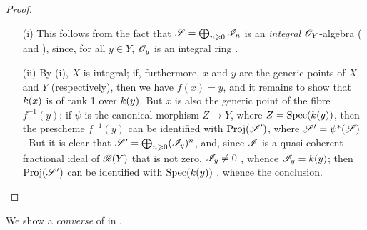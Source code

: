 \begin{proof}
\label{proof-2.8.1.4}
\begin{enumerate}
    \item[\rm{(i)}] This follows from the fact that $\mathscr{S} = \bigoplus_{n\geqslant0}\mathscr{I}_n$ is an \emph{integral} $\mathscr{O}_Y$-algebra ( and ), since, for all $y\in Y$, $\mathscr{O}_y$ is an integral ring .
    \item[\rm{(ii)}] By (i), $X$ is integral;
        if, furthermore, $x$ and $y$ are the generic points of $X$ and $Y$ (respectively), then we have $f(x) = y$, and it remains to show that $k(x)$ is of rank 1 over $k(y)$.
        But $x$ is also the generic point of the fibre $f^{-1}(y)$;
        if $\psi$ is the canonical morphism $Z\to Y$, where $Z=\operatorname{Spec}(k(y))$, then the prescheme $f^{-1}(y)$ can be identified with $\operatorname{Proj}(\mathscr{S}')$, where $\mathscr{S}' = \psi^*(\mathscr{S})$ .
        But it is clear that $\mathscr{S}' = \bigoplus_{n\geqslant0}(\mathscr{I}_y)^n$, and, since $\mathscr{I}$ is a quasi-coherent fractional ideal of $\mathscr{R}(Y)$ that is not zero, $\mathscr{I}_y \neq 0$ , whence $\mathscr{I}_y = k(y)$;
        then $\operatorname{Proj}(\mathscr{S}')$ can be identified with $\operatorname{Spec}(k(y))$ , whence the conclusion.
\end{enumerate}
\end{proof}

We show a \emph{converse} of  in .

